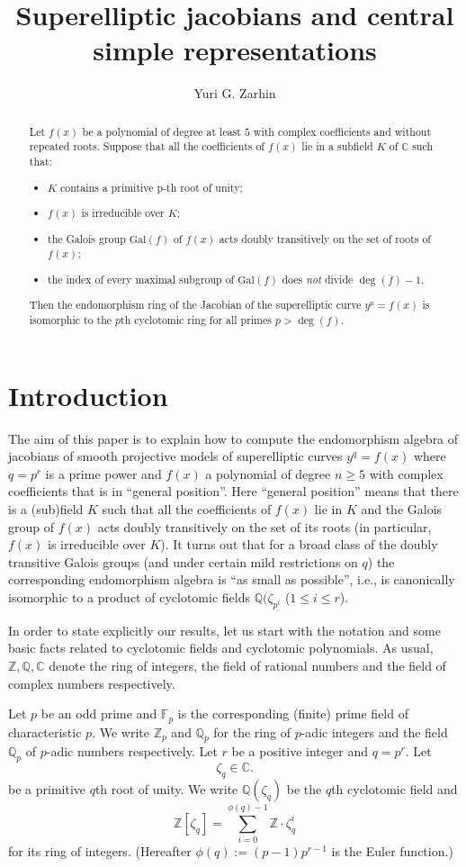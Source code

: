 \documentclass[12pt,a4paper,reqno]{amsart}
\title[Superelliptic  jacobians]
{Superelliptic jacobians and central simple representations}
\author[Yuri G. Zarhin]{Yuri G. Zarhin}
\def\Q{{\mathbb Q}}
\def\Z{{\mathbb Z}}
\def\C{{\mathbb C}}
\def\F{{\mathbb F}}
\def\Gal{\mathrm{Gal}}
\theoremstyle{definition}
\begin{document}
\begin{abstract}
Let $f(x)$ be a polynomial of degree at least $5$ with complex coefficients and without repeated roots. Suppose that all the coefficients of $f(x)$ lie in a subfield $K$ of $\C$ such that: 
\begin{itemize}
\item $K$ contains a primitive p-th root of unity;
\item
 $f(x)$ is irreducible over $K$;
\item
  the Galois group $\Gal(f)$ of $f(x)$ acts doubly transitively on the set of roots of $f(x)$;
\item
 the index of every maximal subgroup of $\Gal(f)$ does {\sl not} divide $\deg(f)-1$. 
 \end{itemize}
Then the endomorphism ring of the Jacobian of the superelliptic curve $y^p=f(x)$ is isomorphic to the $p$th cyclotomic ring for all primes $p>\deg(f)$. 
\end{abstract}
\maketitle
\section{Introduction}
The aim of this paper is to explain how to compute the endomorphism algebra of jacobians of smooth projective models of superelliptic curves $y^q=f(x)$ where $q=p^r$ is a prime power and $f(x)$ a polynomial of degree $n \ge 5$ with complex coefficients that is in ``general position''. Here
``general position'' means that there is a (sub)field $K$ such that all the coefficients of $f(x)$ lie in $K$ and the Galois group of $f(x)$ acts doubly transitively on the set of its roots (in particular, $f(x)$ is irreducible over $K$).  It turns out that for a broad class of the doubly transitive Galois groups (and under certain mild restrictions on $q$) the corresponding endomorphism algebra is ``as small as possible'', i.e., is canonically isomorphic to a product of cyclotomic fields $\Q(\zeta_{p^i}$  ($1 \le i \le r$).

 In order to state explicitly our results, let us start with the notation and some basic facts related to cyclotomic fields and cyclotomic polynomials.
As usual, $\Z,\Q,\C$ denote the ring of integers, the field of rational numbers and the field of complex numbers respectively.

Let $p$ be an odd prime and $\F_p$ is the corresponding (finite) prime field of characteristic $p$. We write $\Z_p$ and $\Q_p$
for the ring of $p$-adic integers and the field $\Q_p$ of $p$-adic numbers respectively.
Let $r$ be a positive integer and $q=p^r$.
Let 
$$\zeta_q \in \C.$$
be a primitive $q$th root of unity. We write $\Q(\zeta_q)$ be the $q$th cyclotomic field and 
$$\Z[\zeta_q]=\sum_{i=0}^{\phi(q)-1}\Z\cdot \zeta_q^i$$
for its ring of integers. (Hereafter $\phi(q):=(p-1)p^{r-1}$ is the Euler function.)
\end{document}
